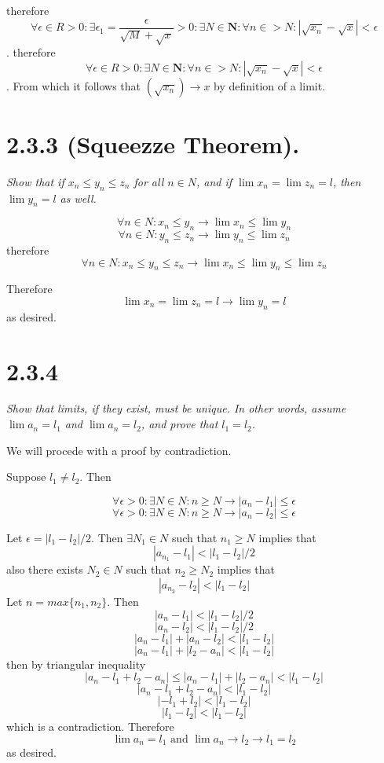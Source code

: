 \documentclass[11pt,oneside,titlepage]{article}
\begin{document}
therefore
$$\forall \epsilon \in R > 0: \exists \epsilon_1 = \frac{\epsilon}{\sqrt{M}
  + \sqrt{x}} > 0:
\exists N \in \textbf{N}: \forall n \in  > N: |\sqrt{x_n} - \sqrt{x}|
< \epsilon$$.
therefore
$$\forall \epsilon \in R > 0: 
\exists N \in \textbf{N}: \forall n \in  > N: |\sqrt{x_n} - \sqrt{x}|
< \epsilon$$.
From which it follows that $(\sqrt{x_n}) \to x$ by definition of a limit.

\section*{2.3.3 (Squeezze Theorem).}
\textit{Show that if $x_n \leq y_n \leq z_n$ for all $n \in N$, and if
  $\lim x_n = \lim z_n = l$, then $\lim y_n = l$ as well.}

$$\forall n \in N: x_n \leq y_n \to \lim x_n \leq \lim y_n$$
$$\forall n \in N: y_n \leq z_n \to \lim y_n \leq \lim z_n$$
therefore
$$\forall n \in N: x_n \leq y_n \leq z_n \to  \lim x_n \leq \lim y_n \leq \lim z_n$$

Therefore
$$\lim x_n = \lim z_n = l \to \lim y_n = l$$
as desired.

\section*{2.3.4}
\textit{Show that limits, if they exist, must be unique. In other words,
  assume $\lim a_n = l_1$ and $\lim a_n = l_2$, and prove that $l_1 = l_2$.}

We will procede with a proof by contradiction.

Suppose $l_1 \neq l_2$. Then

$$\forall \epsilon > 0: \exists N \in N: n \geq N \to |a_n - l_1| \leq \epsilon$$
$$\forall \epsilon > 0: \exists N \in N: n \geq N \to |a_n - l_2| \leq \epsilon$$

Let $\epsilon = |l_1 - l_2|/2$. Then $\exists N_1 \in N$ such that $n_1 \geq N$
implies that 
$$|a_{n_1} - l_1| < |l_1 - l_2|/2$$
also there exists $N_2 \in N$ such that  $n_2 \geq N_2$ implies that 
$$|a_{n_2} - l_2| < |l_1 - l_2|$$
Let $n = max\{n_1, n_2\}$. Then
$$|a_n - l_1| < |l_1 - l_2|/2$$
$$|a_n - l_2| < |l_1 - l_2|/2$$
$$|a_n - l_1| + |a_n - l_2| < |l_1 - l_2|$$
$$|a_n - l_1| + |l_2 - a_n| < |l_1 - l_2|$$
then by triangular inequality
$$|a_n - l_1 + l_2 - a_n| \leq |a_n - l_1| + |l_2 - a_n| < |l_1 - l_2| $$
$$|a_n - l_1 + l_2 - a_n| < |l_1 - l_2| $$
$$| - l_1 + l_2| < |l_1 - l_2| $$
$$| l_1 - l_2| < |l_1 - l_2| $$
which is a contradiction. Therefore
$$\lim a_n = l_1 \text{ and } \lim a_n \to l_2 \to l_1 = l_2$$
as desired.
\end{document}
